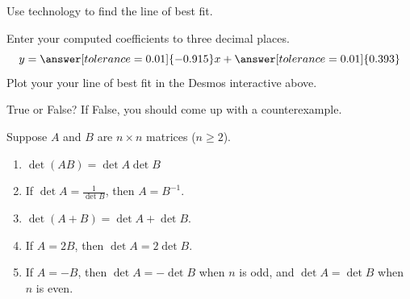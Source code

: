 \documentclass{ximera}
\begin{document}
\begin{exercise}
Use technology to find the line of best fit.
 
\begin{center} 
\end{center}
 
Enter your computed coefficients to three decimal places.
$$y=\answer[tolerance=0.01]{-0.915}x+\answer[tolerance=0.01]{0.393}$$
Plot your your line of best fit in the Desmos interactive above.
 
 \end{exercise}

 \begin{exercise}

True or False?  If False, you should come up with a counterexample.  

Suppose $A$ and $B$ are $n\times n$ matrices ($n\geq 2$).

 \begin{enumerate}
 \item $\det{(AB)}=\det{A}\det{B}$

 \begin{multipleChoice}
 \end{multipleChoice}

 \item If $\det{A}=\frac{1}{\det{B}}$, then $A=B^{-1}$.

 \begin{multipleChoice}
 \end{multipleChoice}

\item $\det{(A+B)}=\det{A}+\det{B}$.

 \begin{multipleChoice}
 \end{multipleChoice}

 \item If $A=2B$, then $\det{A}=2\det{B}$.

 \begin{multipleChoice}
 \end{multipleChoice}

 \item If $A=-B$, then $\det{A}=-\det{B}$ when $n$ is odd, and $\det{A}=\det{B}$ when $n$ is even.

 \begin{multipleChoice}
 \end{multipleChoice}
 \end{enumerate}
\end{exercise}
\end{document}
